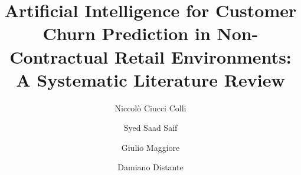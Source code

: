 \documentclass[preprint,12pt]{elsarticle}
\begin{document}
\begin{frontmatter}



\title{Artificial Intelligence for Customer Churn Prediction in Non-Contractual Retail Environments: A Systematic Literature Review}


\author[inst2,inst1]{Niccolò Ciucci Colli} %
\author[inst1,inst2]{Syed Saad Saif}
\author[inst1]{Giulio Maggiore}
\author[inst1]{Damiano Distante}


\begin{abstract}


\end{abstract}
\end{frontmatter}
\end{document}
